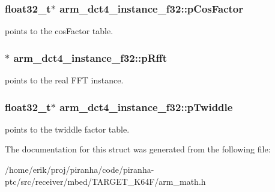 \subsubsection[{\texorpdfstring{p\+Cos\+Factor}{pCosFactor}}]{\setlength{\rightskip}{0pt plus 5cm}float32\+\_\+t$\ast$ arm\+\_\+dct4\+\_\+instance\+\_\+f32\+::p\+Cos\+Factor}\hypertarget{structarm__dct4__instance__f32_a6da1187e070801e011ce5e0582efa861}{}\label{structarm__dct4__instance__f32_a6da1187e070801e011ce5e0582efa861}
points to the cos\+Factor table. 
\subsubsection[{\texorpdfstring{p\+Rfft}{pRfft}}]{$\ast$ arm\+\_\+dct4\+\_\+instance\+\_\+f32\+::p\+Rfft}\hypertarget{structarm__dct4__instance__f32_a978f37fc19add31af243ab5c63ae502f}{}\label{structarm__dct4__instance__f32_a978f37fc19add31af243ab5c63ae502f}
points to the real F\+FT instance. 
\subsubsection[{\texorpdfstring{p\+Twiddle}{pTwiddle}}]{\setlength{\rightskip}{0pt plus 5cm}float32\+\_\+t$\ast$ arm\+\_\+dct4\+\_\+instance\+\_\+f32\+::p\+Twiddle}\hypertarget{structarm__dct4__instance__f32_ad13544aafad268588c62e3eb35ae662c}{}\label{structarm__dct4__instance__f32_ad13544aafad268588c62e3eb35ae662c}
points to the twiddle factor table. 

The documentation for this struct was generated from the following file\+:\begin{DoxyCompactItemize}
\item 
/home/erik/proj/piranha/code/piranha-\/ptc/src/receiver/mbed/\+T\+A\+R\+G\+E\+T\+\_\+\+K64\+F/arm\+\_\+math.\+h\end{DoxyCompactItemize}
